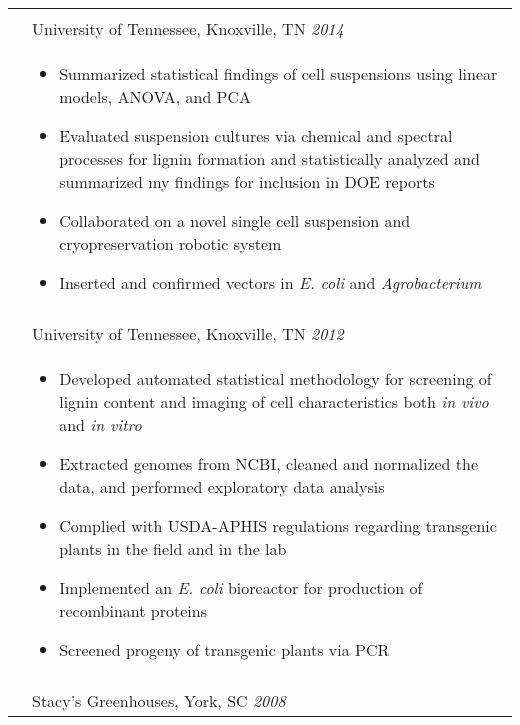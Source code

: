 \documentclass[10pt]{article}
\begin{document}
\begin{minipage}[ht]{.75\linewidth}
\begin{tabularx}{\linewidth}{p{1.8cm}M}
       &  \\
       & University of Tennessee, Knoxville, TN \textit{2014 } \\
       & \begin{itemize}[topsep=-12pt,parsep=0em]
            \setlength\itemsep{0em}
            \item Summarized statistical findings of cell suspensions using linear models, ANOVA, and PCA %
            \item Evaluated suspension cultures via chemical and spectral processes for lignin formation and statistically analyzed and summarized my findings for inclusion in DOE reports %
            \item Collaborated on a novel single cell suspension and cryopreservation robotic system %
            \item {Inserted and confirmed vectors in \textit{E. coli} and \textit{Agrobacterium}}
         \end{itemize} \\
       &  \\
       & University of Tennessee, Knoxville, TN \textit{2012 } \\
       & \begin{itemize}[topsep=-12pt,parsep=0em]
            \setlength\itemsep{0em}
            \item Developed automated statistical methodology for screening of lignin content and imaging of cell characteristics both \textit{in vivo} and \textit{in vitro} %
            \item Extracted genomes from NCBI, cleaned and normalized the data, and performed exploratory data analysis
            \item Complied with USDA-APHIS regulations regarding transgenic plants in the field and in the lab
            \item Implemented an \textit{E. coli} bioreactor for production of recombinant proteins
            \item Screened progeny of transgenic plants via PCR
         \end{itemize} \\
      &  \\
      & Stacy's Greenhouses, York, SC \textit{2008 } \\

\end{tabularx}
\end{minipage}
\end{document}
